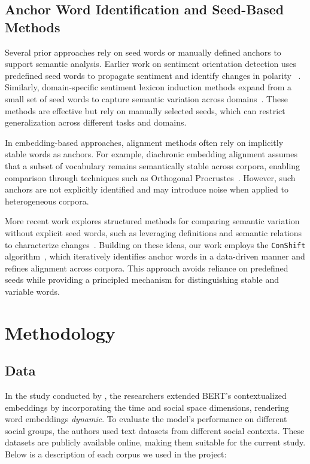 \documentclass[11pt]{article}
\begin{document}
\subsection{Anchor Word Identification and Seed-Based Methods}

Several prior approaches rely on seed words or manually defined anchors to support semantic analysis. Earlier work on sentiment orientation detection uses predefined seed words to propagate sentiment and identify changes in polarity ~\cite{cook2010automatically}. Similarly, domain-specific sentiment lexicon induction methods expand from a small set of seed words to capture semantic variation across domains~\cite{hamilton2016inducing}. These methods are effective but rely on manually selected seeds, which can restrict generalization across different tasks and domains.

In embedding-based approaches, alignment methods often rely on implicitly stable words as anchors. For example, diachronic embedding alignment assumes that a subset of vocabulary remains semantically stable across corpora, enabling comparison through techniques such as Orthogonal Procrustes~\cite{hamilton2016diachronic}. However, such anchors are not explicitly identified and may introduce noise when applied to heterogeneous corpora.

More recent work explores structured methods for comparing semantic variation without explicit seed words, such as leveraging definitions and semantic relations to characterize changes~\cite{cassotti2024using}. Building on these ideas, our work employs the \texttt{ConShift} algorithm~\cite{arrington2025conshift}, which iteratively identifies anchor words in a data-driven manner and refines alignment across corpora. This approach avoids reliance on predefined seeds while providing a principled mechanism for distinguishing stable and variable words.

\section{Methodology}

\subsection{Data}

In the study conducted by \citet{hofmann2021dcwe}, the researchers extended BERT's contextualized embeddings by incorporating the time and social space dimensions, rendering word embeddings \textit{dynamic}. To evaluate the model's performance on different social groups, the authors used text datasets from different social contexts. These datasets are publicly available online, making them suitable for the current study. Below is a description of each corpus we used in the project:
\end{document}
